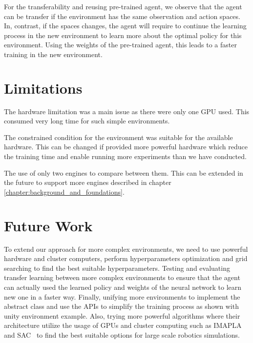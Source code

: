 For the transferability and reusing pre-trained agent, we observe that the agent can be transfer if the environment has the same observation and action spaces. In, contrast, if the spaces changes, the agent will require to continue the learning process in the new environment to learn more about the optimal policy for this environment. Using the weights of the pre-trained agent, this leads to a faster training in the new environment.


\section{Limitations}

The hardware limitation was a main issue as there were only one GPU used. This consumed very long time for such simple environments.

The constrained condition for the environment was suitable for the available hardware. This can be changed if provided more powerful hardware which reduce the training time and enable running more experiments than we have conducted.

The use of only two engines to compare between them. This can be extended in the future to support more engines described in chapter \autoref{chapter:background_and_foundations}.

\section{Future Work}

To extend our approach for more complex environments, we need to use powerful hardware and cluster computers, perform hyperparameters optimization and grid searching to find the best suitable hyperparameters. Testing and evaluating transfer learning between more complex environments to ensure that the agent can actually used the learned policy and weights of the neural network to learn new one in a faster way. Finally, unifying more environments to implement the abstract class and use the APIs to simplify the training process as shown with unity environment example. Also, trying more powerful algorithms where their architecture utilize the usage of GPUs and cluster computing such as IMAPLA~\parencite{espeholt2018impala} and SAC~\parencite{haarnoja2018soft} to find the best suitable options for large scale robotics simulations.